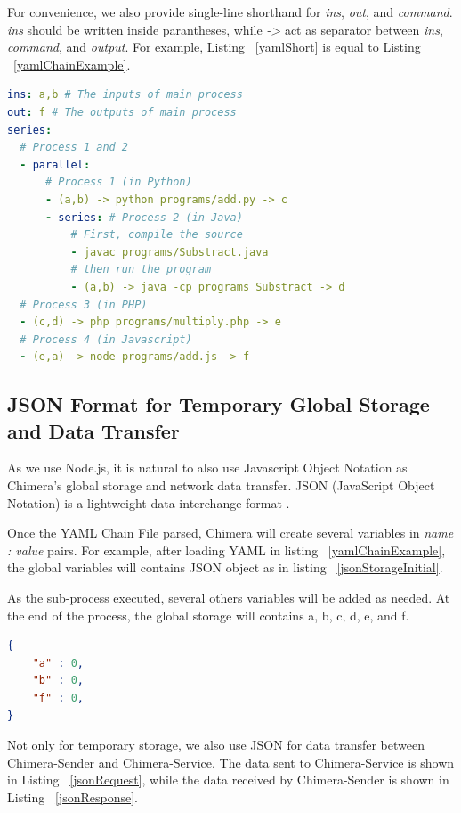 \documentclass[conference]{IEEEtran}
\begin{document}
For convenience, we also provide single-line shorthand for {\it ins}, {\it out}, 
and {\it command}. {\it ins} should be written inside parantheses, while {\it ->}
act as separator between {\it ins}, {\it command}, and {\it output}. For example,
Listing  ~\ref{yamlShort} is equal to Listing ~\ref{yamlChainExample}.

\begin{lstlisting}[caption=YAML Chain With Shorthand, label=yamlShort, language=yaml, basicstyle=\small, breaklines=true]
ins: a,b # The inputs of main process 
out: f # The outputs of main process 
series:
  # Process 1 and 2 
  - parallel:
      # Process 1 (in Python) 
      - (a,b) -> python programs/add.py -> c
      - series: # Process 2 (in Java) 
          # First, compile the source  
          - javac programs/Substract.java
          # then run the program 
          - (a,b) -> java -cp programs Substract -> d
  # Process 3 (in PHP) 
  - (c,d) -> php programs/multiply.php -> e
  # Process 4 (in Javascript) 
  - (e,a) -> node programs/add.js -> f
\end{lstlisting}


\subsection{JSON Format for Temporary Global Storage and Data Transfer}

As we use Node.js, it is natural to also use Javascript Object Notation as Chimera's
global storage and network data transfer. JSON (JavaScript Object Notation) is a 
lightweight data-interchange format \cite{json}.

Once the YAML Chain File parsed, Chimera will create several variables in {\it name : 
value} pairs. For example, after loading YAML in listing ~\ref{yamlChainExample}, the
global variables will contains JSON object as in listing ~\ref{jsonStorageInitial}.

As the sub-process executed, several others variables will be added as needed. At the
end of the process, the global storage will contains a, b, c, d, e, and f.

\begin{lstlisting}[caption=Initial content of JSON Storage, label=jsonStorageInitial, language=json, basicstyle=\small, breaklines=true]
{
    "a" : 0,
    "b" : 0,
    "f" : 0,
}
\end{lstlisting}

Not only for temporary storage, we also use JSON for data transfer between 
Chimera-Sender and Chimera-Service. The data sent to Chimera-Service is shown in Listing
~\ref{jsonRequest}, while the data received by Chimera-Sender is shown in Listing
~\ref{jsonResponse}.
\end{document}

